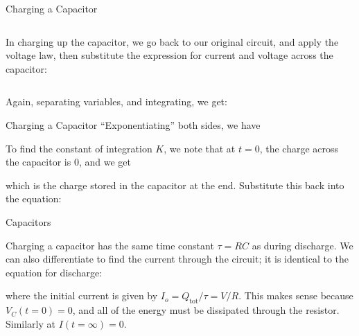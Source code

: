 \documentclass[12pt,aspectratio=169]{beamer}
\begin{document}
\begin{frame}{Charging a Capacitor}
  \begin{columns}
    \centering
    
    In charging up the capacitor, we go back to our original circuit, and apply
    the voltage law, then substitute the expression for current and voltage
    across the capacitor:

  \end{columns}
  \vspace{.2in}Again, separating variables, and integrating, we get:

 \end{frame}



\begin{frame}{Charging a Capacitor}
  ``Exponentiating'' both sides, we have
  

  To find the constant of integration $K$, we note that at $t=0$, the charge
  across the capacitor is $0$, and we get


  which is the charge stored in the capacitor at the end. Substitute this back
  into the equation:

\end{frame}




\begin{frame}{Capacitors}


  \vspace{-.1in}Charging a capacitor has the same time constant $\tau=RC$ as
  during discharge. We can also differentiate to find the current through the
  circuit; it is identical to the equation for discharge:


  where the initial current is given by $I_o=Q_\text{tot}/\tau=V/R$. This
  makes sense because $V_C(t=0)=0$, and all of the energy must be dissipated
  through the resistor. Similarly at $I(t=\infty)=0$.
\end{frame}
\end{document}
